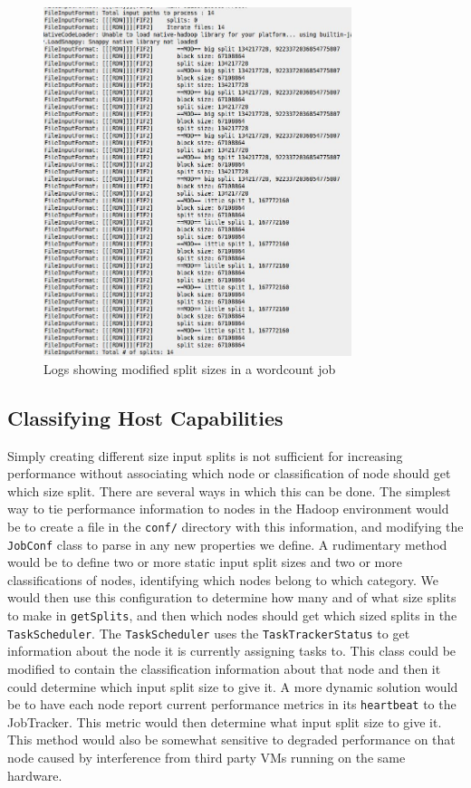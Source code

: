 \begin{figure}[ht!]
\centering
\includegraphics[width=90mm]{getSplitsLog.jpg}
\caption{Logs showing modified split sizes in a wordcount job}
\label{fig:getSplitsLog}
\end{figure}

\subsection{Classifying Host Capabilities}
Simply creating different size input splits is not sufficient for increasing
performance without associating which node or classification of node should
get which size split. There are several ways in which this can be done.
The simplest way to tie performance information to nodes in the Hadoop
environment would be to create a file in the \texttt{conf/} directory with
this information, and modifying the
\texttt{JobConf} class to parse in any new properties we define. A rudimentary
method would be to define two or more static input split sizes and two or more
classifications of nodes, identifying which nodes belong to which category.
We would then
use this configuration to determine how many and of what size splits to make
in \texttt{getSplits}, and then which nodes should get which sized splits
in the \texttt{TaskScheduler}. The \texttt{TaskScheduler} uses the
\texttt{TaskTrackerStatus} to get information about the node it is currently
assigning tasks to. This class could be modified to contain the classification
information about that node and then it could determine which input split size
to give it. A more dynamic solution would be to have each node report current
performance metrics in its \texttt{heartbeat} to the JobTracker. This metric
would then determine what input split size to give it. This method would also be
somewhat sensitive to degraded performance on that node caused by interference
from third party VMs running on the same hardware.
